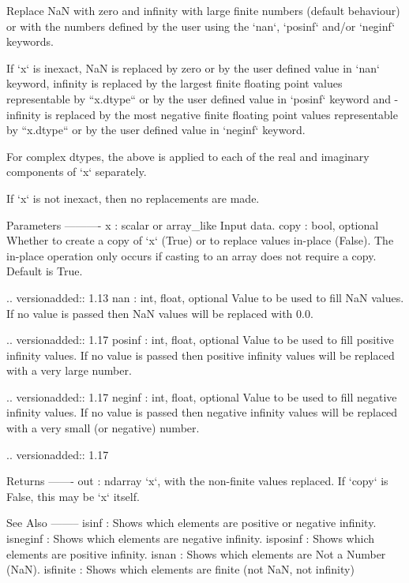\begin{DoxyVerb}Replace NaN with zero and infinity with large finite numbers (default
behaviour) or with the numbers defined by the user using the `nan`, 
`posinf` and/or `neginf` keywords.

If `x` is inexact, NaN is replaced by zero or by the user defined value in
`nan` keyword, infinity is replaced by the largest finite floating point 
values representable by ``x.dtype`` or by the user defined value in 
`posinf` keyword and -infinity is replaced by the most negative finite 
floating point values representable by ``x.dtype`` or by the user defined 
value in `neginf` keyword.

For complex dtypes, the above is applied to each of the real and
imaginary components of `x` separately.

If `x` is not inexact, then no replacements are made.

Parameters
----------
x : scalar or array_like
    Input data.
copy : bool, optional
    Whether to create a copy of `x` (True) or to replace values
    in-place (False). The in-place operation only occurs if
    casting to an array does not require a copy.
    Default is True.
    
    .. versionadded:: 1.13
nan : int, float, optional
    Value to be used to fill NaN values. If no value is passed 
    then NaN values will be replaced with 0.0.
    
    .. versionadded:: 1.17
posinf : int, float, optional
    Value to be used to fill positive infinity values. If no value is 
    passed then positive infinity values will be replaced with a very
    large number.
    
    .. versionadded:: 1.17
neginf : int, float, optional
    Value to be used to fill negative infinity values. If no value is 
    passed then negative infinity values will be replaced with a very
    small (or negative) number.
    
    .. versionadded:: 1.17

    

Returns
-------
out : ndarray
    `x`, with the non-finite values replaced. If `copy` is False, this may
    be `x` itself.

See Also
--------
isinf : Shows which elements are positive or negative infinity.
isneginf : Shows which elements are negative infinity.
isposinf : Shows which elements are positive infinity.
isnan : Shows which elements are Not a Number (NaN).
isfinite : Shows which elements are finite (not NaN, not infinity)


\end{DoxyVerb}

